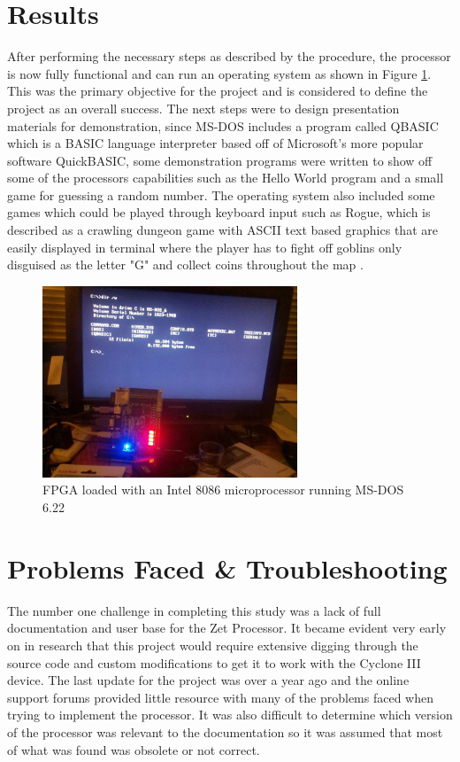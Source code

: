 \documentclass[11pt,peerreview, onecolumn]{IEEEtran}
\begin{document}
\section{Results}
After performing the necessary steps as described by the procedure, the processor is now fully functional and can run an operating system as shown in Figure \ref{fig:WorkingFPGA}. This was the primary objective for the project and is considered to define the project as an overall success. The next steps were to design presentation materials for demonstration, since MS-DOS includes a program called QBASIC which is a BASIC language interpreter based off of Microsoft's more popular software QuickBASIC, some demonstration programs were written to show off some of the processors capabilities such as the Hello World program and a small game for guessing a random number. The operating system also included some games which could be played through keyboard input such as Rogue, which is described as a crawling dungeon game with ASCII text based graphics that are easily displayed in terminal where the player has to fight off goblins only disguised as the letter "G" and collect coins throughout the map \cite{Rogue}. 

\begin{figure}[!h]
\centering
\includegraphics[width=3in]{fpgaworking}
\caption{FPGA loaded with an Intel 8086 microprocessor running MS-DOS 6.22}
\label{fig:WorkingFPGA}
\end{figure}

\section{Problems Faced \& Troubleshooting}
The number one challenge in completing this study was a lack of full documentation and user base for the Zet Processor. It became evident very early on in research that this project would require extensive digging through the source code and custom modifications to get it to work with the Cyclone III device. The last update for the project was over a year ago and the online support forums provided little resource with many of the problems faced when trying to implement the processor. It was also difficult to determine which version of the processor was relevant to the documentation so it was assumed that most of what was found was obsolete or not correct.
\end{document}
